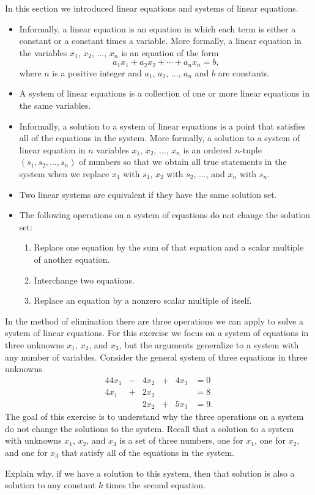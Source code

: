 In this section we introduced linear equations and systems of linear equations. 
\begin{itemize}
\item Informally, a linear equation is an equation in which each term is either a constant or a constant times a variable. More formally, a linear equation in the variables $x_1$, $x_2$, $\ldots$, $x_n$ is an equation of the form
\[a_1x_1 + a_2x_2 + \cdots + a_nx_n = b,\]
where $n$ is a positive integer and $a_1$, $a_2$, $\ldots$, $a_n$ and $b$ are constants.
\item A system of linear equations is a collection of one or more linear equations in the same variables.
\item Informally, a solution to a system of linear equations is a point that satisfies all of the equations in the system. More formally, a solution to a system of linear equation in $n$ variables $x_1$, $x_2$, $\ldots$, $x_n$ is an ordered $n$-tuple $(s_1, s_2, \ldots, s_n)$ of numbers so that we obtain all true statements in the system when we replace $x_1$ with $s_1$, $x_2$ with $s_2$, $\ldots$, and $x_n$ with $s_n$.
\item Two linear systems are equivalent if they have the same solution set. 
\item The following operations on a system of equations do not change the solution set: 
\begin{enumerate}
\item Replace one equation by the sum of that equation and a scalar multiple of another equation.
\item Interchange two equations.
\item Replace an equation by a nonzero scalar multiple of itself.
\end{enumerate}
\end{itemize}




\be

\item In the method of elimination there are three operations we can apply to solve a system of linear equations. For this exercise we focus on a system of equations in three unknowns $x_1$, $x_2$, and $x_3$, but the arguments generalize to a system with any number of variables. Consider the general system of three equations in three unknowns
\begin{alignat*}{4}
4x_1 	&{}-{}	&4x_2	&{}+{}	&4x_3 	&= 0  \\ 
4x_1 	&{}+{}	&2x_2	&{}		&{} 		&= 8  \\
{} 	&{}		&2x_2	&{}+{}	&5x_3	&= 9.  
\end{alignat*}
The goal of this exercise is to understand why the three operations on a system do not change the solutions to the system. Recall that a solution to a system with unknowns $x_1$, $x_2$, and $x_3$ is a set of three numbers, one for $x_1$, one for $x_2$, and one for $x_3$ that satisfy all of the equations in the system. 
	\ba
	\item Explain why, if we have a solution to this system, then that solution is also a solution to any constant $k$ times the second equation.  

